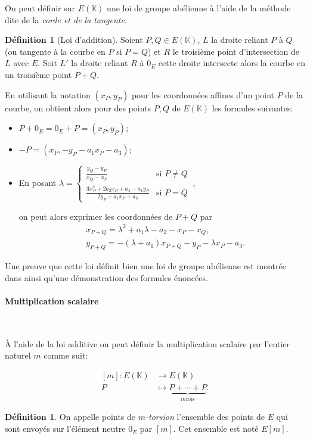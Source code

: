 \documentclass[10pt,a4paper]{book}
\theoremstyle{plain}
\theoremstyle{definition}
\theoremstyle{definition}
\theoremstyle{definition}
\theoremstyle{definition}
\theoremstyle{definition}
\newtheorem{defi}[thm]{Définition}
\theoremstyle{remark}
\theoremstyle{remark}
\theoremstyle{definition}
\begin{document}
On peut définir sur $E(\mathbb{K})$ une loi de groupe abélienne à l'aide de la méthode dite de la \emph{corde et de la tangente}.

\begin{defi}[Loi d'addition]
Soient $P,Q \in E(\mathbb{K})$, $L$ la droite reliant $P$ à $Q$ (ou tangente à la courbe en $P$ si $P=Q$) et $R$ le troisième point d'intersection de $L$ avec $E$. Soit $L'$ la droite reliant $R$ à $0_E$ cette droite intersecte alors la courbe en un troisième point $P+Q$.
\end{defi}

En utilisant la notation $(x_P,y_P)$ pour les coordonnées affines d'un point $P$ de la courbe, on obtient alors pour des points $P,Q$ de $E(\mathbb{K})$ les formules suivantes:
\begin{itemize}
\item $P+0_E=0_E+P=(x_P,y_P)$;
\item $-P=(x_P,-y_P-a_1x_P-a_3)$;
\item En posant $\lambda= \begin{cases}
\frac{y_{Q}-y_{P}}{x_{Q}-x_{P}} & \text{si } P\neq Q\\
\frac{3x_{P}^{2}+2a_{2}x_{P}+a_{4}-a_{1}y_{P}}{2y_{P}+a_{1}x_{P}+a_{3}} & \text{si } P=Q
\end{cases}\ $,

on peut alors exprimer les coordonnées de $P+Q$ par
\begin{equation*}
\begin{alignedat}{1}
& x_{P+Q}=\lambda^2 +a_1\lambda-a_2-x_P-x_Q,\\
& y_{P+Q}=-(\lambda +a_1)x_{P+Q}-y_{P}-\lambda x_P-a_3.
\end{alignedat}
\end{equation*}
\end{itemize}

Une preuve que cette loi définit bien une loi de groupe abélienne est montrée dans \cite[III.2.2]{Silv1} ainsi qu'une démonstration des formules énoncées.


\paragraph*{Multiplication scalaire}\   {
\newline


\`A l'aide de la loi additive on peut définir la multiplication scalaire par l'entier naturel $m$ comme suit:

\begin{equation}
\begin{alignedat}{1}
[m]: E(\mathbb{K}) & \rightarrow E(\mathbb{K}) \\
P & \mapsto \underbrace{P+ \cdots +P}_{m \text{fois}}. 
\end{alignedat}
\end{equation}

\begin{defi}
On appelle points de \emph{$m$-torsion} l'ensemble des points de $E$ qui sont envoyés sur l'élément neutre $0_E$ par $[m]$. Cet ensemble est noté $E[m]$.
\end{defi}
}
\end{document}
